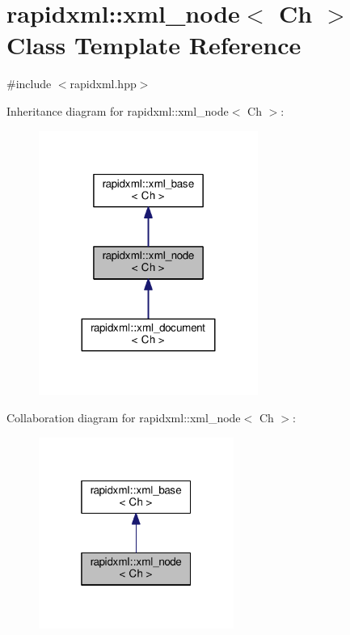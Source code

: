 \hypertarget{classrapidxml_1_1xml__node}{}\section{rapidxml\+:\+:xml\+\_\+node$<$ Ch $>$ Class Template Reference}
\label{classrapidxml_1_1xml__node}


{\ttfamily \#include $<$rapidxml.\+hpp$>$}



Inheritance diagram for rapidxml\+:\+:xml\+\_\+node$<$ Ch $>$\+:\nopagebreak
\begin{figure}[H]
\begin{center}
\leavevmode
\includegraphics[width=203pt]{classrapidxml_1_1xml__node__inherit__graph}
\end{center}
\end{figure}


Collaboration diagram for rapidxml\+:\+:xml\+\_\+node$<$ Ch $>$\+:\nopagebreak
\begin{figure}[H]
\begin{center}
\leavevmode
\includegraphics[width=181pt]{classrapidxml_1_1xml__node__coll__graph}
\end{center}
\end{figure}
